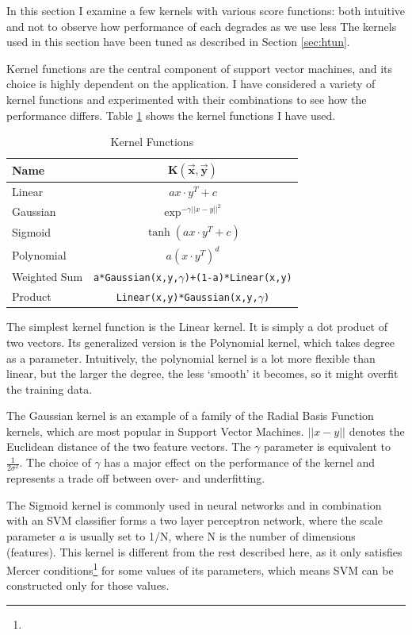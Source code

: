 \documentclass[12pt,notitlepage,twoside]{scrreprt}
\begin{document}
In this section I examine a few kernels with various score functions: both intuitive
and not to observe how performance of each degrades as we use less 
The kernels used in this section have been tuned as described in Section \ref{sec:htun}.

Kernel functions are the central component of support vector machines, and its
choice is highly dependent on the application. I have considered a variety of
kernel functions and experimented with their combinations to see how the
performance differs. Table \ref{kfun} shows the kernel functions I have used.
\begin{table}[h]
\begin{center}
\begin{tabular}{|l|c|}
  \hline
  \textbf{Name} &\( \bm{K(\vec{x},\vec{y})}\)\\
  \hline\hline
  Linear  & \(ax\cdot y^T + c\)\\  
\hline
Gaussian  & \(\exp^{-\gamma ||x-y||^2}\)\\
\hline
Sigmoid   &   \(\tanh(ax \cdot y^T + c)\)\\
\hline
Polynomial& \(a(x\cdot y^T)^d\)  \\
\hline
Weighted Sum&  \texttt{a*Gaussian(x,y,\(\gamma\))+(1-a)*Linear(x,y)}\\
\hline
Product     & \texttt{Linear(x,y)*Gaussian(x,y,\(\gamma\))}\\
\hline
\end{tabular}
\end{center}
\caption{Kernel Functions \label{kfun}}
\end{table}

The simplest kernel function is the Linear kernel. It is simply a dot product
of two vectors. Its generalized version is the Polynomial kernel, which takes
degree as a parameter. Intuitively, the polynomial kernel is a lot more
flexible than linear, but the larger the degree, the less `smooth' it becomes,
so it might overfit the training data.  

The Gaussian kernel is an example of a family of the Radial Basis Function kernels, which
are
most popular in Support Vector Machines. \(||x-y||\) denotes the
Euclidean distance of the two feature vectors. The \(\gamma\) parameter is
equivalent to \(\frac{1}{2\sigma^2}\). The choice of \(\gamma\) has a major
effect on the performance of the kernel and represents a trade off between over-
and underfitting. 

The Sigmoid kernel is commonly used in neural networks
and in combination with an SVM classifier forms a two layer perceptron network,
where the scale parameter \(a\) is usually set to 1/N, where N is the number of
dimensions (features)\cite{sigmoid}. This kernel is different from the rest described
here, as it only satisfies Mercer conditions\footnote{} for some values of its parameters, which
	means SVM can be constructed only for those values\cite{stat_learn}.
\end{document}
